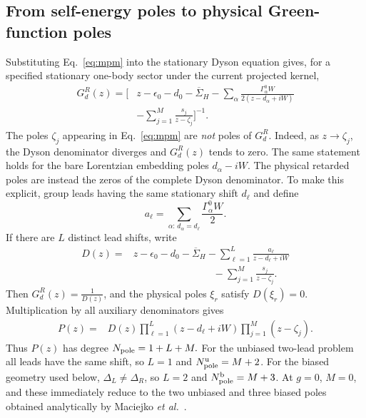 \documentclass[
 reprint,
 superscriptaddress,
 amsmath,amssymb,
 aps,prb,
 longbibliography,
 floatfix
]{revtex4-2}
\newcommand{\barSigma}{\overline{\Sigma}}
\begin{document}
\subsection{From self-energy poles to physical Green-function poles}
\label{sec:physical-green-poles}

Substituting Eq.~\eqref{eq:mpm} into the stationary Dyson equation gives, for a specified stationary one-body sector under the current projected kernel,
\begin{equation*}
\begin{aligned}
G_d^R(z)
=
\Bigg[
&z-\epsilon_0-d_0-\barSigma_H
-
\sum_\alpha
\frac{
\Gamma_\alpha^0W
}{
2(z-d_\alpha+iW)
}
\\
&-
\sum_{j=1}^{M}
\frac{s_j}{z-\zeta_j}
\Bigg]^{-1}.
\end{aligned}
\end{equation*}
The poles $\zeta_j$ appearing in Eq.~\eqref{eq:mpm} are \emph{not} poles of $G_d^R$. Indeed, as $z\rightarrow\zeta_j$, the Dyson denominator diverges and $G_d^R(z)$ tends to zero. The same statement holds for the bare Lorentzian embedding poles $d_\alpha-iW$. The physical retarded poles are instead the zeros of the complete Dyson denominator. To make this explicit, group leads having the same stationary shift $d_\ell$ and define
\begin{equation*}
a_\ell
=
\sum_{\alpha:\,d_\alpha=d_\ell}
\frac{\Gamma_\alpha^0W}{2}.
\end{equation*}
If there are $L$ distinct lead shifts, write
\begin{equation}
\begin{aligned}
D(z)
={}&
z-\epsilon_0-d_0-\barSigma_H
-
\sum_{\ell=1}^{L}
\frac{a_\ell}
{z-d_\ell+iW}
\\
&\qquad\qquad\qquad\qquad-
\sum_{j=1}^{M}
\frac{s_j}{z-\zeta_j}.
\end{aligned}
\label{eq:Dyson-denominator-MPM}
\end{equation}
Then $G_d^R(z) = \frac{1}{D(z)}$, and the physical poles $\xi_r$ satisfy $D(\xi_r)=0$. Multiplication by all auxiliary denominators gives
\begin{equation}
\begin{aligned}
P(z)
={}&
D(z)
\prod_{\ell=1}^{L}
(z-d_\ell+iW)
\prod_{j=1}^{M}
(z-\zeta_j).
\end{aligned}
\label{eq:physical-pole-polynomial}
\end{equation}
Thus $P(z)$ has degree $N_{\rm pole} = 1+L+M.$ For the unbiased two-lead problem all leads have the same shift, so $L=1$ and $N_{\rm pole}^{\rm u} = M+2$. For the biased geometry used below, $\Delta_L\neq\Delta_R$, so $L=2$ and $N_{\rm pole}^{\rm b} = M+3$. At $g=0$, $M=0$, and these immediately reduce to the two unbiased and three biased poles obtained analytically by Maciejko \textit{et al.}~\cite{MaciejkoWangGuo2006}.
\end{document}
